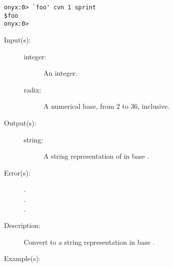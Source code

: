 \begin{description}
\begin{description}
\begin{verbatim}
onyx:0> `foo' cvn 1 sprint
$foo
onyx:0>
		\end{verbatim}
	\end{description}
\label{systemdict:cvrs}
\item[{\onyxop{integer radix}{cvrs}{string}}: ]
	\begin{description}\item[]
	\item[Input(s): ]
		\begin{description}\item[]
		\item[integer: ]
			An integer.
		\item[radix: ]
			A numerical base, from 2 to 36, inclusive.
		\end{description}
	\item[Output(s): ]
		\begin{description}\item[]
		\item[string: ]
			A string representation of  in base
			.
		\end{description}
	\item[Error(s): ]
		\begin{description}\item[]
		\item[.]
		\item[.]
		\item[.]
		\end{description}
	\item[Description: ]
		Convert  to a string representation in base
		.
	\item[Example(s): ]\begin{verbatim}


\end{verbatim}
\end{description}
\end{description}

